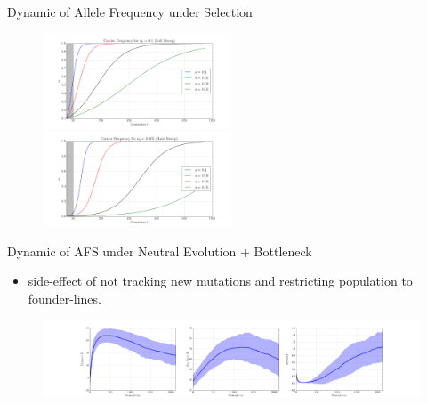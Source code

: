 \documentclass[t]{beamer} %
\begin{document}
\begin{frame}{Dynamic of Allele Frequency under Selection}

\begin{figure}
\centering
\hspace{-0in}\includegraphics[trim={2in 0.5in 1.5in 0in},clip,page=2,width=0.5\textwidth]{sigmoidSoft}
\hspace{-0in}\includegraphics[trim={2in 0.5in 1.9in 0in},clip,page=2,width=0.5\textwidth]{sigmoidHard}
\end{figure}
\end{frame}

\begin{frame}{Dynamic of AFS under Neutral Evolution + Bottleneck}
\begin{itemize}
	\item side-effect of not tracking new mutations and restricting population 
	to founder-lines.
\end{itemize}
\begin{figure}
\centering
\includegraphics[trim=2in 0 2in 0, clip,width=\textwidth]{bottleneck}
\end{figure}

\end{frame}
\end{document}
